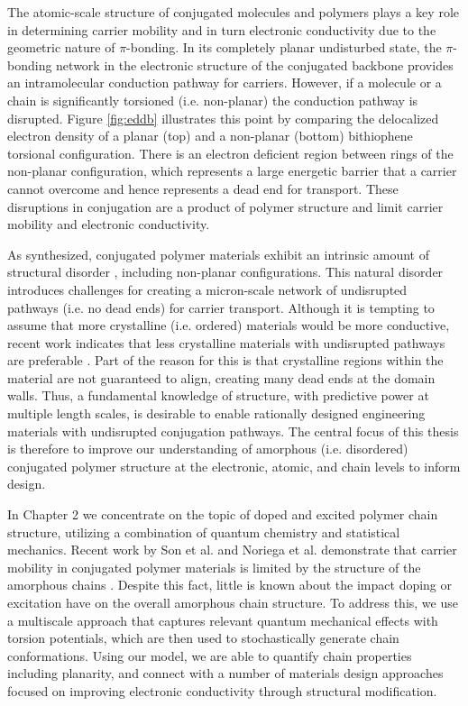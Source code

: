 The atomic-scale structure of conjugated molecules and polymers plays a key role in determining carrier mobility and in turn electronic conductivity due to the geometric nature of $\pi$-bonding. In its completely planar undisturbed state, the $\pi$-bonding network in the electronic structure of the conjugated backbone provides an intramolecular conduction pathway for carriers. However, if a molecule or a chain is significantly torsioned (i.e. non-planar) the conduction pathway is disrupted. Figure \ref{fig:eddb} illustrates this point by comparing the delocalized electron density of a planar (top) and a non-planar (bottom) bithiophene torsional configuration. There is an electron deficient region between rings of the non-planar configuration, which represents a large energetic barrier that a carrier cannot overcome and hence represents a dead end for transport. These disruptions in conjugation are a product of polymer structure and limit carrier mobility and electronic conductivity.

As synthesized, conjugated polymer materials exhibit an intrinsic amount of structural disorder \cite{Noriega2013, Shen2016}, including non-planar configurations. This natural disorder introduces challenges for creating a micron-scale network of undisrupted pathways (i.e. no dead ends) for carrier transport. Although it is tempting to assume that more crystalline (i.e. ordered) materials would be more conductive, recent work indicates that less crystalline materials with undisrupted pathways are preferable \cite{Noriega2013, Son2016}. Part of the reason for this is that crystalline regions within the material are not guaranteed to align, creating many dead ends at the domain walls. Thus, a fundamental knowledge of structure, with predictive power at multiple length scales, is desirable to enable rationally designed engineering materials with undisrupted conjugation pathways. The central focus of this thesis is therefore to improve our understanding of amorphous (i.e. disordered) conjugated polymer structure at the electronic, atomic, and chain levels to inform design.

In Chapter 2 we concentrate on the topic of doped and excited polymer chain structure, utilizing a combination of quantum chemistry and statistical mechanics. Recent work by Son et al. and Noriega et al. demonstrate that carrier mobility in conjugated polymer materials is limited by the structure of the amorphous chains \cite{Noriega2013, Son2016}. Despite this fact, little is known about the impact doping or excitation have on the overall amorphous chain structure. To address this, we use a multiscale approach that captures relevant quantum mechanical effects with torsion potentials, which are then used to stochastically generate chain conformations. Using our model, we are able to quantify chain properties including planarity, and connect with a number of materials design approaches focused on improving electronic conductivity through structural modification.

